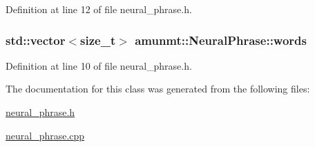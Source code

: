 Definition at line 12 of file neural\+\_\+phrase.\+h.

\subsubsection[{\texorpdfstring{words}{words}}]{\setlength{\rightskip}{0pt plus 5cm}std\+::vector$<$size\+\_\+t$>$ amunmt\+::\+Neural\+Phrase\+::words}\hypertarget{classamunmt_1_1NeuralPhrase_a11ad83191b990eff20e271d8c300cba5}{}\label{classamunmt_1_1NeuralPhrase_a11ad83191b990eff20e271d8c300cba5}


Definition at line 10 of file neural\+\_\+phrase.\+h.



The documentation for this class was generated from the following files\+:\begin{DoxyCompactItemize}
\item 
\hyperlink{neural__phrase_8h}{neural\+\_\+phrase.\+h}\item 
\hyperlink{neural__phrase_8cpp}{neural\+\_\+phrase.\+cpp}\end{DoxyCompactItemize}

